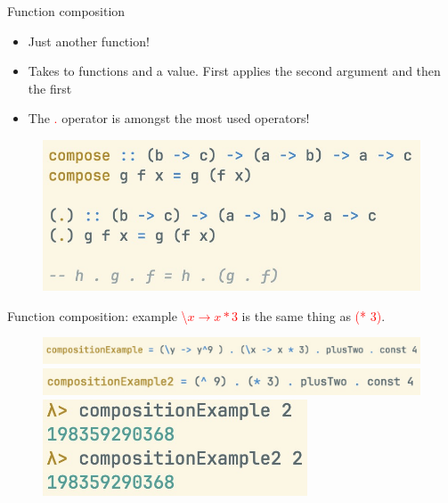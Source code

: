 \documentclass[pdf]{beamer}
\newcommand{\code}[1]{\textcolor{Red}{\textsf{#1}}}
\begin{document}
\begin{frame}{Function composition}
  \begin{itemize}
  \item Just another function!
  \item Takes to functions and a value. First applies the second argument and then the first
  \item The \code{.} operator is amongst the most used operators!
  \end{itemize}

  \begin{figure}[H]
    \includegraphics[width=\textwidth]{compose}
  \end{figure}
\end{frame}

\begin{frame}{Function composition: example}
  \code{\textbackslash $x \to x * 3$} is the same thing as \code{(* 3)}.
  \begin{figure}[H]
    \includegraphics[width=1.0\textwidth]{compositionExample}
    \vspace{0.2cm}
    \includegraphics[width=1.0\textwidth]{compositionExample2}
    \vspace{0.2cm}
    \includegraphics[width=0.70\textwidth]{compositionExample-ghci}
  \end{figure}
\end{frame}
\end{document}
